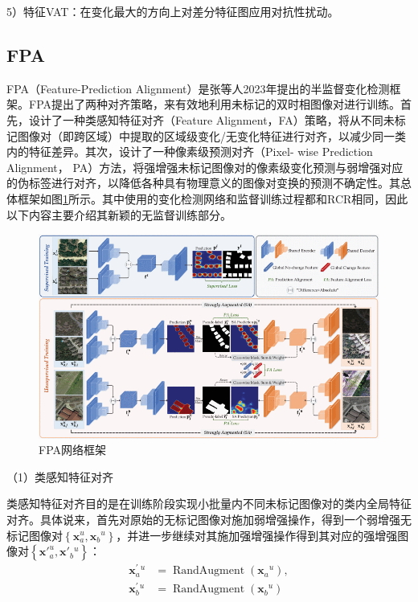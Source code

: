 \documentclass[lang=chs, degree=master, blindreview=false, adobe=false]{yanputhesis}
\begin{document}
5）特征VAT\cite{2019VAT}：在变化最大的方向上对差分特征图应用对抗性扰动。
\subsection{FPA}
FPA（Feature-Prediction Alignment）是张等人\cite{Zhang2023FPA}2023年提出的半监督变化检测框架。FPA提出了两种对齐策略，来有效地利用未标记的双时相图像对进行训练。首先，设计了一种类感知特征对齐（Feature Alignment，FA）策略，将从不同未标记图像对（即跨区域）中提取的区域级变化/无变化特征进行对齐，以减少同一类内的特征差异。其次，设计了一种像素级预测对齐（Pixel- wise Prediction Alignment， PA）方法，将强增强未标记图像对的像素级变化预测与弱增强对应的伪标签进行对齐，以降低各种具有物理意义的图像对变换的预测不确定性。其总体框架如图\ref{fig:FPAfram}所示。其中使用的变化检测网络和监督训练过程都和RCR\cite{bandara2022RCR}相同，因此以下内容主要介绍其新颖的无监督训练部分。
\begin{figure}[htb]
  \centering
  \includegraphics[scale=0.55]{images/FPAframe.png}
  \caption{
    FPA网络框架\cite{Zhang2023FPA}
  }
  \label{fig:FPAfram}
\end{figure}

（1）类感知特征对齐

类感知特征对齐目的是在训练阶段实现小批量内不同未标记图像对的类内全局特征对齐。具体说来，首先对原始的无标记图像对施加弱增强操作，得到一个弱增强无标记图像对$\left\{\mathbf{x}_{a}^{u}, \mathbf{x}_{b}{ }^{u}\right\}$，并进一步继续对其施加强增强操作得到其对应的强增强图像对$\left\{\mathbf{x'}_{a}^{u}, \mathbf{x'}_{b}{ }^{u}\right\}$：
\begin{equation}
  \label{eq:FPAaug}
  \begin{aligned}
    \mathbf{x}_{a}^{\prime}{ }^{u} & =\operatorname{RandAugment}\left(\mathbf{x}_{a}{ }^{u}\right), \\
    \mathbf{x}_{b}^{\prime}{ }^{u} & =\operatorname{RandAugment}\left(\mathbf{x}_{b}{ }^{u}\right)
  \end{aligned}
\end{equation}
\end{document}
